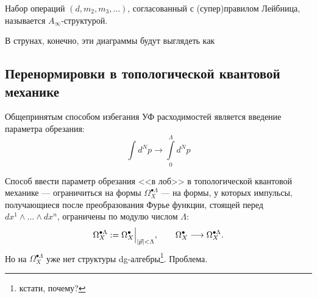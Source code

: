 \documentclass[11pt]{article}
\theoremstyle{remark}
\theoremstyle{definition}
\newcommand{\que}[1]{\footnote{\textcolor[rgb]{0.38,0.69,0.82}{#1}}}
\begin{document}
Набор операций $(d, m_2, m_3, ...)$, согласованный с (супер)правилом Лейбница, называется $A_{\infty}$-структурой.

В струнах, конечно, эти диаграммы будут выглядеть как

\begin{center}
\end{center}


\subsection{Перенормировки в топологической квантовой механике}

Общепринятым способом избегания УФ расходимостей является введение параметра обрезания:
$$\int d^N p \longrightarrow \int\limits_0^{\Lambda} d^N p$$

Способ ввести параметр обрезания <<в лоб>> в топологической квантовой механике --- ограничиться на формы $\Omega_X^{\bullet \Lambda}$ --- на формы, у которых импульсы, получающиеся после преобразования Фурье функции, стоящей перед $dx^1 \wedge ... \wedge dx^n$, ограничены по модулю числом $\Lambda$: $$\Omega_X^{\bullet \Lambda} := \Omega_X^{\bullet}\Big|_{|\vec p| < \Lambda}, \hskip 20 pt \Omega_X^{\bullet} \longrightarrow \Omega_X^{\bullet \Lambda}.$$ Но на $\Omega_X^{\bullet \Lambda}$ уже нет структуры dg-алгебры\que{кстати, почему?}. Проблема.
\end{document}
